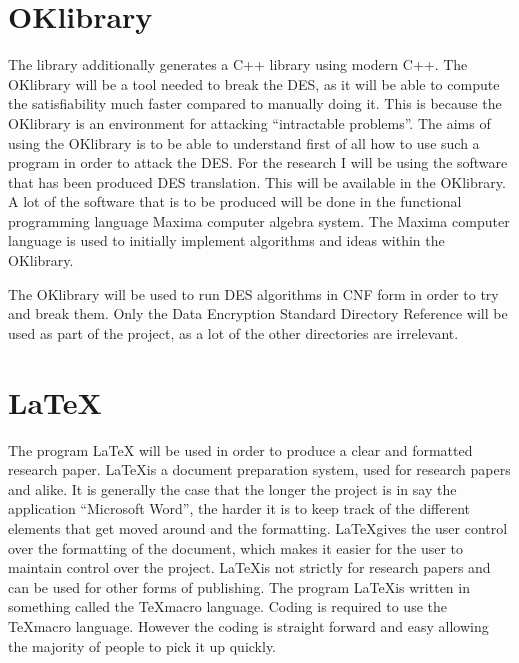 \documentclass[11pt,a4paper]{report}
\begin{document}
\section{OKlibrary}
\label{sec:OKl}
The library additionally generates a C++ library using modern C++.
The OKlibrary will be a tool needed to break the DES, as it will be able to compute the satisfiability much faster compared to manually doing it. This is because the OKlibrary is an environment for attacking “intractable problems”. The aims of using the OKlibrary is to be able to understand first of all how to use such a program in order to attack the DES.
For the research I will be using the software that has been produced DES translation. This will be available in the OKlibrary. A lot of the software that is to be produced will be done in the functional programming language Maxima computer algebra system. The Maxima computer language is used to initially implement algorithms and ideas within the OKlibrary.

The OKlibrary will be used to run DES algorithms in CNF form in order to try and break them. Only the Data Encryption Standard Directory Reference will be used as part of the project, as a lot of the other directories are irrelevant.



\section{ \LaTeX}
\label{sec:LaTeX}
The program LaTeX will be used in order to produce a clear and formatted research paper. \LaTeX\space is a document preparation system, used for research papers and alike. It is generally the case that the longer the project is in say the application “Microsoft Word”, the harder it is to keep track of the different elements that get moved around and the formatting. \LaTeX\space gives the user control over the formatting of the document, which makes it easier for the user to maintain control over the project. \LaTeX\space is not strictly for research papers and can be used for other forms of publishing. The program \LaTeX\space is written in something called the \TeX\space macro language. Coding is required to use the \TeX\space macro language. However the coding is straight forward and easy allowing the majority of people to pick it up quickly.
\end{document}
